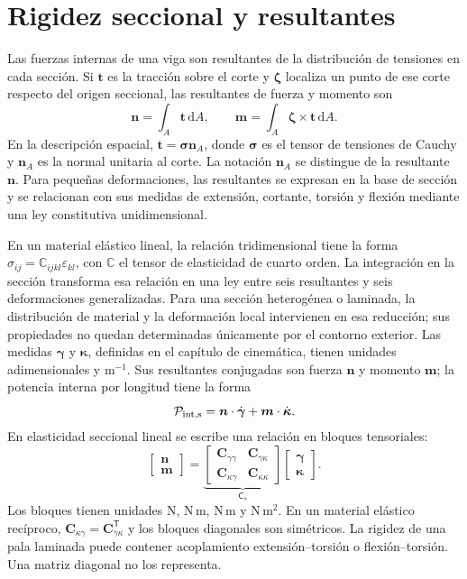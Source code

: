 \documentclass[11pt,a4paper,oneside]{report}
\newcommand{\vct}[1]{\bm{#1}}
\newcommand{\ten}[1]{\boldsymbol{#1}}
\newcommand{\dd}{\mathrm d}
\newcommand{\tr}{\mathsf T}
\begin{document}
\section{Rigidez seccional y resultantes}
Las fuerzas internas de una viga son resultantes de la distribución de tensiones en cada sección. Si $\vct t$ es la tracción sobre el corte y $\vct\zeta$ localiza un punto de ese corte respecto del origen seccional, las resultantes de fuerza y momento son
\begin{equation}
 \vct n=\int_A\vct t\,\dd A,\qquad
 \vct m=\int_A\vct\zeta\times\vct t\,\dd A.
 \label{eq:resultantes-seccion}
\end{equation}
En la descripción espacial, $\vct t=\ten\sigma\vct n_A$, donde $\ten\sigma$ es el tensor de tensiones de Cauchy y $\vct n_A$ es la normal unitaria al corte. La notación $\vct n_A$ se distingue de la resultante $\vct n$. Para pequeñas deformaciones, las resultantes se expresan en la base de sección y se relacionan con sus medidas de extensión, cortante, torsión y flexión mediante una ley constitutiva unidimensional.

En un material elástico lineal, la relación tridimensional tiene la forma $\sigma_{ij}=\mathbb C_{ijkl}\varepsilon_{kl}$, con $\mathbb C$ el tensor de elasticidad de cuarto orden. La integración en la sección transforma esa relación en una ley entre seis resultantes y seis deformaciones generalizadas. Para una sección heterogénea o laminada, la distribución de material y la deformación local intervienen en esa reducción; sus propiedades no quedan determinadas únicamente por el contorno exterior.
Las medidas $\vct\gamma$ y $\vct\kappa$, definidas en el capítulo de cinemática, tienen unidades adimensionales y $\mathrm{m^{-1}}$. Sus resultantes conjugadas son fuerza $\vct n$ y momento $\vct m$; la potencia interna por longitud tiene la forma
\begin{equation}
 \mathcal P_{\rm int,s}=\vct n\cdot\dot{\vct\gamma}+\vct m\cdot\dot{\vct\kappa}.
\end{equation}
En elasticidad seccional lineal se escribe una relación en bloques tensoriales:
\begin{equation}
 \begin{bmatrix}\vct n\\\vct m\end{bmatrix}=
 \underbrace{\begin{bmatrix}
 \ten C_{\gamma\gamma}&\ten C_{\gamma\kappa}\\
 \ten C_{\kappa\gamma}&\ten C_{\kappa\kappa}
 \end{bmatrix}}_{\mathsf C_s}
 \begin{bmatrix}\vct\gamma\\\vct\kappa\end{bmatrix}.
 \label{eq:Csection}
\end{equation}
Los bloques tienen unidades $\mathrm N$, $\mathrm{N\,m}$, $\mathrm{N\,m}$ y $\mathrm{N\,m^2}$. En un material elástico recíproco, $\ten C_{\kappa\gamma}=\ten C_{\gamma\kappa}^\tr$ y los bloques diagonales son simétricos. La rigidez de una pala laminada puede contener acoplamiento extensión--torsión o flexión--torsión. Una matriz diagonal no los representa.
\end{document}
